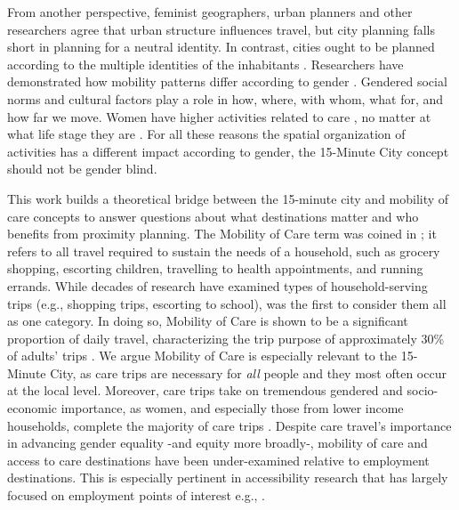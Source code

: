 \documentclass[
  authoryear,
  preprint,
  3p]{elsarticle}
\begin{document}
From another perspective, feminist geographers, urban planners and other
researchers agree that urban structure influences travel, but city
planning falls short in planning for a neutral identity. In contrast,
cities ought to be planned according to the multiple identities of the
inhabitants
\citep{vacchelli_towards_2018, urbandevelopmentviennaGenderMainstreamingUrban2013}.
Researchers have demonstrated how mobility patterns differ according to
gender
\citep{lawWomenTransportNew1999, cresswell_gendered_2008, levy2013travel, little_gender_1994, tronto_toward_1990}.
Gendered social norms and cultural factors play a role in how, where,
with whom, what for, and how far we move. Women have higher activities
related to care \citep{ilo_care_2018}, no matter at what life stage they
are \citep{garciaromanGenderDifferencesTime2022}. For all these reasons
the spatial organization of activities has a different impact according
to gender, the 15-Minute City concept should not be gender blind.

This work builds a theoretical bridge between the 15-minute city and
mobility of care concepts to answer questions about what destinations
matter and who benefits from proximity planning. The Mobility of Care
term was coined in
\citet{sanchezdemadariagaMobilityCareIntroducing2013}; it refers to all
travel required to sustain the needs of a household, such as grocery
shopping, escorting children, travelling to health appointments, and
running errands. While decades of research have examined types of
household-serving trips (e.g., shopping trips, escorting to school),
\citet{sanchezdemadariagaMobilityCareIntroducing2013} was the first to
consider them all as one category. In doing so, Mobility of Care is
shown to be a significant proportion of daily travel, characterizing the
trip purpose of approximately 30\% of adults' trips
\citep{sanchezdemadariagaMobilityCareIntroducing2013, sanchezdemadariagaMeasuringMobilitiesCare2019, ravensbergen2023exploratory}.
We argue Mobility of Care is especially relevant to the 15-Minute City,
as care trips are necessary for \emph{all} people and they most often
occur at the local level. Moreover, care trips take on tremendous
gendered and socio-economic importance, as women, and especially those
from lower income households, complete the majority of care trips
\citep{ravensbergen2023exploratory}. Despite care travel's importance in
advancing gender equality -and equity more broadly-, mobility of care
and access to care destinations have been under-examined relative to
employment destinations. This is especially pertinent in accessibility
research that has largely focused on employment points of interest e.g.,
\citep{farberOntarioLineSocioeconomic2019, duarteInfluenceJobAccessibility2023, ryanAccessibilitySpaceTime2023}.
\end{document}

